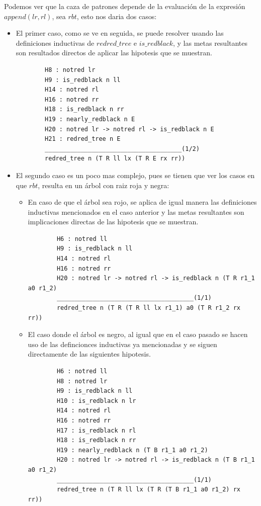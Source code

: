 \documentclass[8pt,leqno,pdflatex,spanish]{book}
\theoremstyle{plain}
\theoremstyle{definition}
\theoremstyle{remark}
\begin{document}
Podemos ver que la caza de patrones depende de la evaluaci\'on de la expresi\'on $append(lr,rl)$, 
sea $rbt$, esto nos daria dos casos:

\begin{itemize}
    \item El primer caso, como se ve en seguida, se puede resolver usando las definiciones 
    inductivas de $redred\_tree$ e $is\_redblack$, y las metas resultantes son resultados directos 
    de aplicar las hipotesis que se muestran.
    \begin{verbatim}
        H8 : notred lr
        H9 : is_redblack n ll
        H14 : notred rl
        H16 : notred rr
        H18 : is_redblack n rr
        H19 : nearly_redblack n E
        H20 : notred lr -> notred rl -> is_redblack n E
        H21 : redred_tree n E
        ______________________________________(1/2)
        redred_tree n (T R ll lx (T R E rx rr))
    \end{verbatim}
    \item El segundo caso es un poco mas complejo, pues se tienen que ver los casos en que $rbt$, 
    resulta en un \'arbol con raiz roja y negra:
    \begin{itemize}
        \item En caso de que el \'arbol sea rojo, se aplica de igual manera las definiciones 
        inductivas mencionados en el caso anterior y las metas resultantes son implicaciones 
        directas de las hipotesis que se muestran.
        \begin{verbatim}
        H6 : notred ll
        H9 : is_redblack n ll
        H14 : notred rl
        H16 : notred rr
        H20 : notred lr -> notred rl -> is_redblack n (T R r1_1 a0 r1_2)
        ______________________________________(1/1)
        redred_tree n (T R (T R ll lx r1_1) a0 (T R r1_2 rx rr))
        \end{verbatim}
        \item El caso donde el \'arbol es negro, al igual que en el caso pasado se hacen uso de 
        las defincionces inductivas ya mencionadas y se siguen directamente de las siguientes 
        hipotesis.
        \begin{verbatim}
        H6 : notred ll
        H8 : notred lr
        H9 : is_redblack n ll
        H10 : is_redblack n lr
        H14 : notred rl
        H16 : notred rr
        H17 : is_redblack n rl
        H18 : is_redblack n rr
        H19 : nearly_redblack n (T B r1_1 a0 r1_2)
        H20 : notred lr -> notred rl -> is_redblack n (T B r1_1 a0 r1_2)
        ______________________________________(1/1)
        redred_tree n (T R ll lx (T R (T B r1_1 a0 r1_2) rx rr))
        \end{verbatim}
    \end{itemize}
\end{itemize}
\end{document}
